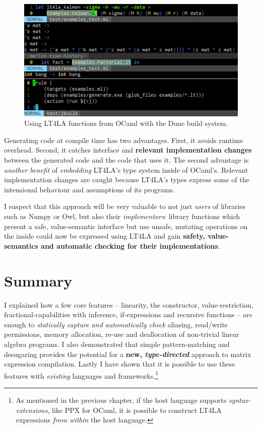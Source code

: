 \begin{figure}[t]
    \centering
    \includegraphics[width=\textwidth]{impl_build}
    \caption{Using LT4LA functions from OCaml with the Dune
        build system.}\label{fig:build}
\end{figure}

Generating code at compile time has two advantages. First, it avoids runtime
overhead. Second, it catches interface and \textbf{relevant implementation
changes} between the generated code and the code that uses it.  The second
advantage is \emph{another benefit} of \emph{embedding} LT4LA's type system
inside of OCaml's. Relevant implementation changes are caught because LT4LA's
types express some of the intensional behaviour and assumptions of its
programs.

I suspect that this approach will be very valuable to not just \emph{users} of
libraries such as Numpy or Owl, but also their \emph{implementors}: library
functions which present a safe, value-semantic interface but use unsafe,
mutating operations on the inside could now be expressed using LT4LA and gain
\textbf{safety, value-semantics and automatic checking for their implementations}.

\clearpage%
\section{Summary}

I explained how a few core features -- linearity, the 
constructor, value-restriction, fractional-capabilities with inference,
if-expressions and recursive functions -- are enough to \emph{statically
capture and automatically check} aliasing, read/write permissions, memory
allocation, re-use and deallocation of non-trivial linear algebra programs. I
also demonstrated that simple pattern-matching and desugaring provides the
potential for a \textbf{new, \emph{type-directed}} approach to matrix expression
compilation. Lastly I have shown that it is possible to use these features with
\emph{existing} languages and frameworks.\footnote{As mentioned in the previous
chapter, if the host language supports \emph{syntax-extensions}, like PPX
for OCaml, it is possible to construct LT4LA expressions \emph{from within} the
host language.}

